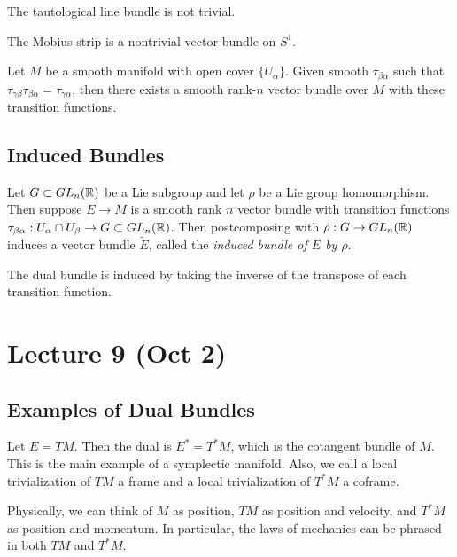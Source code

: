 \documentclass[twoside, 10pt]{article}
\begin{document}
    \begin{exm} The tautological line bundle is not trivial.  \end{exm}

    \begin{exm} The Mobius strip is a nontrivial vector bundle on $S^1$.
    \end{exm}

    \begin{thm} Let $M$ be a smooth manifold with open cover $\{U_{\alpha}\}$.
        Given smooth $\tau_{\beta\alpha}$ such that
        $\tau_{\gamma\beta}\tau_{\beta\alpha} = \tau_{\gamma\alpha}$, then
        there exists a smooth rank-$n$ vector bundle over $M$ with these
        transition functions.  \end{thm}

    \subsection{Induced Bundles}%
    
    Let $G \subset GL_n(\mathbb{R})$ be a Lie subgroup and let $\rho$ be a Lie group
    homomorphism. Then suppose $E \to M$ is a smooth rank $n$ vector bundle
    with transition functions $\tau_{\beta\alpha}: U_{\alpha} \cap U_{\beta}
    \to G \subset GL_n(\mathbb{R})$. Then postcomposing with $\rho:G \to GL_n(\mathbb{R})$
    induces a vector bundle $\widetilde{E}$, called the \textit{induced bundle
    of $E$ by $\rho$}.

    \begin{exm} The dual bundle is induced by taking the inverse of the
    transpose of each transition function.  \end{exm}

    \section{Lecture 9 (Oct 2)}%
    
    \subsection{Examples of Dual Bundles}%
    
    \begin{exm} Let $E = TM$. Then the dual is $E^* = T^*M$, which is the
        cotangent bundle of $M$. This is the main example of a symplectic
        manifold. Also, we call a local trivialization of $TM$ a frame and a
        local trivialization of $T^*M$ a coframe.

        Physically, we can think of $M$ as position, $TM$ as position and
    velocity, and $T^*M$ as position and momentum. In particular, the laws of
mechanics can be phrased in both $TM$ and $T^*M$.  \end{exm}
\end{document}
